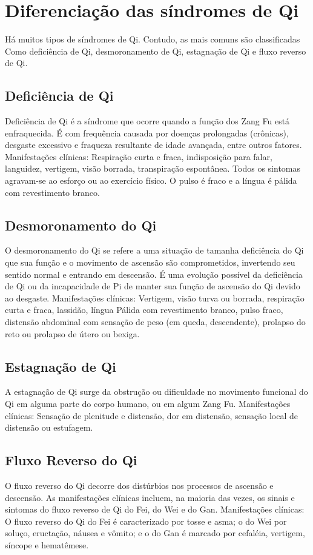 \documentclass[12pt,oneside,a4paper]{book} %
\begin{document}
\section{Diferenciação das síndromes de Qi}

Há muitos tipos de síndromes de Qi. Contudo, as mais comuns são classificadas Como deficiência de Qi, desmoronamento de Qi, estagnação de Qi e fluxo reverso de Qi.

\subsection{Deficiência de Qi}
Deficiência de Qi é a síndrome que ocorre quando a função dos Zang Fu está enfraquecida. É com frequência causada por doenças prolongadas (crônicas), desgaste excessivo e fraqueza resultante de idade avançada, entre outros fatores.
Manifestações clínicas: Respiração curta e fraca, indisposição para falar, languidez, vertigem, visão borrada, transpiração espontânea. Todos os sintomas agravam-se ao esforço ou ao exercício físico. O pulso é fraco e a língua é pálida com revestimento branco.

\subsection{Desmoronamento do Qi}
O desmoronamento do Qi se refere a uma situação de tamanha deficiência do Qi que sua função e o movimento de ascensão são comprometidos, invertendo seu sentido normal e entrando em descensão.
É uma evolução possível da deficiência de Qi ou da incapacidade de Pi de manter sua função de ascensão do Qi devido ao desgaste.
Manifestações clínicas: Vertigem, visão turva ou borrada, respiração curta e fraca, lassidão, língua Pálida com revestimento branco, pulso fraco, distensão abdominal com sensação de peso (em queda, descendente), prolapso do reto ou prolapso de útero ou bexiga.

\subsection{Estagnação de Qi}
A estagnação de Qi surge da obstrução ou dificuldade no movimento funcional do Qi em alguma parte do corpo humano, ou em algum Zang Fu.
Manifestações clínicas: Sensação de plenitude e distensão, dor em distensão, sensação local de distensão ou estufagem.

\subsection{Fluxo Reverso do Qi}
O fluxo reverso do Qi decorre dos distúrbios nos processos de ascensão e descensão. As manifestações clínicas incluem, na maioria das vezes, os sinais e sintomas do fluxo reverso de Qi do Fei, do Wei e do Gan.
Manifestações clínicas: O fluxo reverso do Qi do Fei é caracterizado por tosse e asma; o do Wei por soluço, eructação, náusea e vômito; e o do Gan é marcado por cefaléia, vertigem, síncope e hematêmese.
\end{document}
